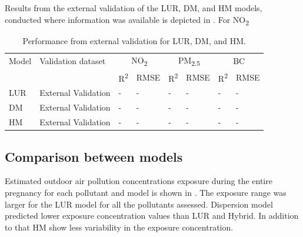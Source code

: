 \documentclass{article}
\begin{document}
Results from the external validation of the LUR, DM, and HM models, conducted where information was available is depicted in . For NO\textsubscript{2}


\begin{table}
    \centering
    \caption{Performance from external validation for LUR, DM, and HM.}
    \label{table2}
    \begin{tabular}{llllllll}
    \toprule
         Model & Validation dataset & \multicolumn{2}{c}{NO\textsubscript{2}} &  \multicolumn{2}{c}{PM\textsubscript{2.5}} &  \multicolumn{2}{c}{BC} \\
         \cmidrule(lr){3-8}
         & & R\textsuperscript{2} & RMSE & R\textsuperscript{2} & RMSE & R\textsuperscript{2} & RMSE \\
    \midrule
         LUR & External Validation & - & - & - & - & - & - \\
         DM & External Validation & - & - & - & - & - & - \\
         HM & External Validation & - & - & - & - & - & - \\
    \bottomrule
    \end{tabular}
\end{table}






\newpage
\subsection{Comparison between models} %

Estimated outdoor air pollution concentrations exposure during the entire pregnancy for each pollutant and model is shown in . The exposure range was larger for the LUR model for all the pollutants assessed. Dispersion model predicted lower exposure concentration values than LUR and Hybrid. In addition to that HM show less variability in the exposure concentration.
\end{document}
